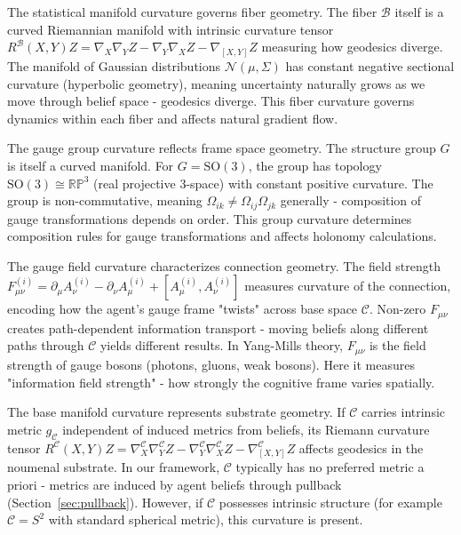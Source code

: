 \documentclass[11pt]{article}
\begin{document}
The statistical manifold curvature governs fiber geometry. The fiber $\mathcal{B}$ itself is a curved Riemannian manifold with intrinsic curvature tensor $R^\mathcal{B}(X,Y)Z = \nabla_X \nabla_Y Z - \nabla_Y \nabla_X Z - \nabla_{[X,Y]} Z$ measuring how geodesics diverge. The manifold of Gaussian distributions $\mathcal{N}(\mu, \Sigma)$ has constant negative sectional curvature (hyperbolic geometry), meaning uncertainty naturally grows as we move through belief space - geodesics diverge. This fiber curvature governs dynamics within each fiber and affects natural gradient flow.

The gauge group curvature reflects frame space geometry. The structure group $G$ is itself a curved manifold. For $G = \mathrm{SO}(3)$, the group has topology $\mathrm{SO}(3) \cong \mathbb{RP}^3$ (real projective 3-space) with constant positive curvature. The group is non-commutative, meaning $\Omega_{ik} \neq \Omega_{ij}\Omega_{jk}$ generally - composition of gauge transformations depends on order. This group curvature determines composition rules for gauge transformations and affects holonomy calculations.

The gauge field curvature characterizes connection geometry. The field strength $F^{(i)}_{\mu\nu} = \partial_\mu A^{(i)}_\nu - \partial_\nu A^{(i)}_\mu + [A^{(i)}_\mu, A^{(i)}_\nu]$ measures curvature of the connection, encoding how the agent's gauge frame "twists" across base space $\mathcal{C}$. Non-zero $F_{\mu\nu}$ creates path-dependent information transport - moving beliefs along different paths through $\mathcal{C}$ yields different results. In Yang-Mills theory, $F_{\mu\nu}$ is the field strength of gauge bosons (photons, gluons, weak bosons). Here it measures "information field strength" - how strongly the cognitive frame varies spatially.

The base manifold curvature represents substrate geometry. If $\mathcal{C}$ carries intrinsic metric $g_{\mathcal{C}}$ independent of induced metrics from beliefs, its Riemann curvature tensor $R^\mathcal{C}(X,Y)Z = \nabla^\mathcal{C}_X \nabla^\mathcal{C}_Y Z - \nabla^\mathcal{C}_Y \nabla^\mathcal{C}_X Z - \nabla^\mathcal{C}_{[X,Y]} Z$ affects geodesics in the noumenal substrate. In our framework, $\mathcal{C}$ typically has no preferred metric a priori - metrics are induced by agent beliefs through pullback (Section~\ref{sec:pullback}). However, if $\mathcal{C}$ possesses intrinsic structure (for example $\mathcal{C} = S^2$ with standard spherical metric), this curvature is present.
\end{document}
